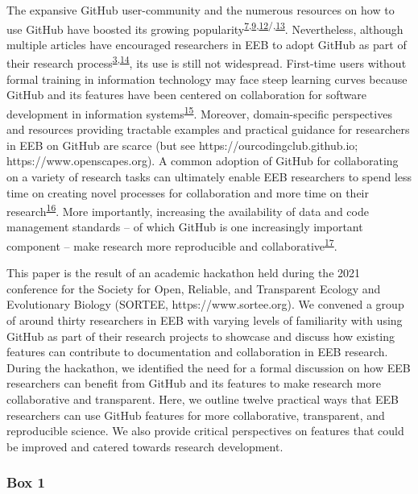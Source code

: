 The expansive GitHub user-community and the numerous resources on how to use GitHub have boosted its growing popularity\textsuperscript{\protect\hyperlink{ref-RVetqmsg}{7},\protect\hyperlink{ref-kEX5dgzK}{9},\protect\hyperlink{ref-13jOlVcpp}{12}/,\protect\hyperlink{ref-u5aEVE4B}{13}}.
Nevertheless, although multiple articles have encouraged researchers in EEB to adopt GitHub as part of their research process\textsuperscript{\protect\hyperlink{ref-10ghgV3S8}{3},\protect\hyperlink{ref-3DKwn1sY}{14}}, its use is still not widespread.
First-time users without formal training in information technology may face steep learning curves because GitHub and its features have been centered on collaboration for software development in information systems\textsuperscript{\protect\hyperlink{ref-139b0pSGc}{15}}.
Moreover, domain-specific perspectives and resources providing tractable examples and practical guidance for researchers in EEB on GitHub are scarce (but see https://ourcodingclub.github.io; https://www.openscapes.org).
A common adoption of GitHub for collaborating on a variety of research tasks can ultimately enable EEB researchers to spend less time on creating novel processes for collaboration and more time on their research\textsuperscript{\protect\hyperlink{ref-ydrk01SR}{16}}.
More importantly, increasing the availability of data and code management standards -- of which GitHub is one increasingly important component -- make research more reproducible and collaborative\textsuperscript{\protect\hyperlink{ref-13QX8XU3J}{17}}.

This paper is the result of an academic hackathon held during the 2021 conference for the Society for Open, Reliable, and Transparent Ecology and Evolutionary Biology (SORTEE, https://www.sortee.org).
We convened a group of around thirty researchers in EEB with varying levels of familiarity with using GitHub as part of their research projects to showcase and discuss how existing features can contribute to documentation and collaboration in EEB research.
During the hackathon, we identified the need for a formal discussion on how EEB researchers can benefit from GitHub and its features to make research more collaborative and transparent.
Here, we outline twelve practical ways that EEB researchers can use GitHub features for more collaborative, transparent, and reproducible science.
We also provide critical perspectives on features that could be improved and catered towards research development.

\hypertarget{definitions}{%
\subsubsection{Box 1}\label{definitions}}

